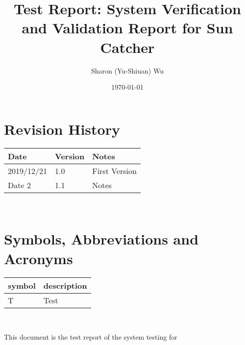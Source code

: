 \documentclass[12pt, titlepage]{article}
\begin{document}
\title{Test Report: System Verification and Validation Report for Sun Catcher} 
\author{Sharon (Yu-Shiuan) Wu}
\date{\today}
	
\maketitle


\section{Revision History}

\begin{tabularx}{\textwidth}{p{3cm}p{2cm}X}
\toprule {\bf Date} & {\bf Version} & {\bf Notes}\\
\midrule
2019/12/21 & 1.0 & First Version\\
Date 2 & 1.1 & Notes\\
\bottomrule
\end{tabularx}

~\newpage

\section{Symbols, Abbreviations and Acronyms}

\renewcommand{\arraystretch}{1.2}
\begin{tabular}{l l} 
  \toprule		
  \textbf{symbol} & \textbf{description}\\
  \midrule 
  T & Test\\
  \bottomrule
\end{tabular}\\


\newpage

\tableofcontents

\listoftables %

\listoffigures %

\newpage


This document is the test report of the system testing for \progname
\end{document}
